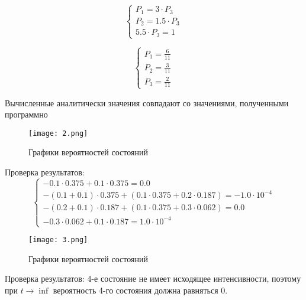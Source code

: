 	\begin{equation*}
		\left\{\begin{array}{l}
			P_1 = 3 \cdot P_3 \\
			P_2 = 1.5 \cdot P_3 \\
			5.5 \cdot P_3  = 1
		\end{array}\right.
	\end{equation*}

	\begin{equation*}
		\left\{\begin{array}{l}
			P_1 = \frac{6}{11} \\
			P_2 = \frac{3}{11} \\
			P_3  = \frac{2}{11}
		\end{array}\right.
	\end{equation*}
	
	Вычисленные аналитически значения совпадают со значениями, полученными программно
	
	\newpage
	\begin{figure}[h]
		\begin{center}
			{\texttt{[image: 2.png]}
			\caption{Графики вероятностей состояний}
			\label{pic:2}}
		\end{center}
	\end{figure}

	Проверка результатов:
	\begin{equation}
		\left\{\begin{array}{l}
			-0.1\cdot0.375 + 0.1 \cdot 0.375 = 0.0 \\
			-(0.1+0.1)\cdot0.375 + (0.1\cdot0.375 + 0.2\cdot0.187) = -1.0\cdot10^{-4} \\
			-(0.2+0.1)\cdot0.187 + (0.1\cdot0.375 + 0.3\cdot0.062) = 0.0 \\
			-0.3\cdot0.062 + 0.1\cdot0.187 = 1.0\cdot10^{-4}
		\end{array}\right.
	\end{equation}
	
	\newpage
	\begin{figure}[h]
		\begin{center}
			{\texttt{[image: 3.png]}
			\caption{Графики вероятностей состояний}
			\label{pic:3}}
		\end{center}
	\end{figure}

	Проверка результатов: 4-е состояние не имеет исходящее интенсивности, поэтому при $t \rightarrow \inf$ вероятность 4-го состояния должна равняться 0.
